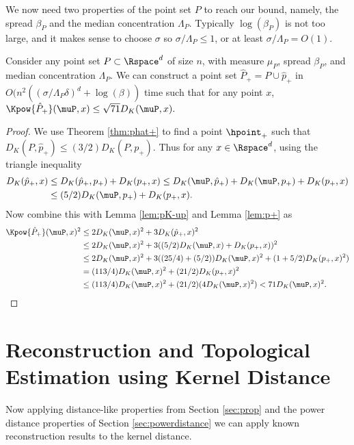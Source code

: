\documentclass[11pt]{myclass}
\begin{document}
We now need two properties of the point set $P$ to reach our bound, namely, the spread $\beta_P$ and the median concentration $\Lambda_P$. Typically $\log(\beta_P)$ is not too large, and it makes sense to choose $\sigma$ so $\sigma/\Lambda_P \leq 1$, or at least $\sigma/\Lambda_P = O(1)$.  





\begin{theorem}
\label{thm:powK-up-hat}
Consider  any point set $P \subset \Rspace^d$ of size $n$, with measure $\mu_P$, spread $\beta_P$, and median concentration $\Lambda_P$.  We can construct a point set $\hat P_+ = P \cup \hat p_+$ in $O(n^2((\sigma/\Lambda_P \delta)^d + \log(\beta))$ time such that for any point $x$, 
$
\Kpow{\hat P_+}(\muP,x) \leq \sqrt{71} D_K(\muP,x).
$  
\end{theorem}
\begin{proof}
We use Theorem \ref{thm:phat+} to find a point $\hpoint_+$ such that $D_K(P,\hat p_+) \leq (3/2) D_K(P,p_+)$. Thus for any $x \in \Rspace^d$, using the triangle inequality
\begin{align*}
D_K(\hat p_+,x) 
&\leq 
D_K(\hat p_+,p_+) + D_K(p_+,x)
\leq
D_K(\muP, \hat p_+) + D_K(\muP,p_+) + D_K(p_+,x)
\\ & \leq 
(5/2) D_K(\muP, p_+) + D_K(p_+,x).
\end{align*}
Now combine this with Lemma \ref{lem:pK-up} and Lemma \ref{lem:p+} as
\begin{align*}
\Kpow{\hat P_+}(\muP,x)^2 
&\leq 
2 D_K(\muP,x)^2 + 3 D_K(\hat p_+,x)^2
\\ &\leq
2 D_K(\muP,x)^2 + 3 ((5/2) D_K(\muP,x) + D_K(p_+,x))^2
\\ &\leq
2 D_K(\muP,x)^2 + 3 ((25/4) + (5/2)) D_K(\muP,x)^2 + (1+5/2) D_K(p_+,x)^2)
\\ & = 
(113/4) D_K(\muP,x)^2 + (21/2) D_K(p_+,x)^2
\\ &\leq
(113/4) D_K(\muP,x)^2 + (21/2) (4 D_K(\muP,x)^2)
<  
71 D_K(\muP,x)^2.  \qedhere
\end{align*}
\end{proof}






\section{Reconstruction and Topological Estimation using Kernel Distance}
\label{sec:recon}

Now applying distance-like properties from Section \ref{sec:prop} and the power distance properties of Section \ref{sec:powerdistance} we can apply known reconstruction results to the kernel distance.  
\end{document}
